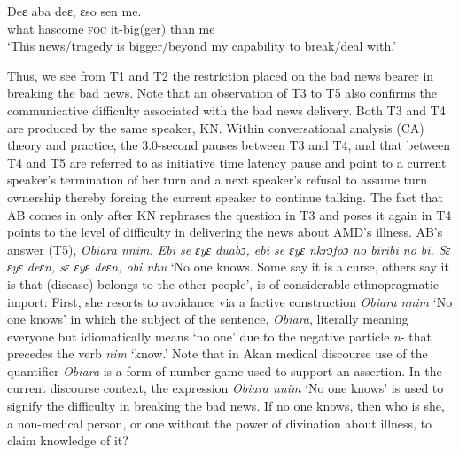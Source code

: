 \documentclass[output=paper,colorlinks,citecolor=brown]{langscibook}
\begin{document}
\ea\label{ex:obeng:29}
    \gll    Deɛ aba deɛ, ɛso sen me.\\
            what hascome \textsc{foc} it-big(ger) than me\\
    \glt    `This news/tragedy is bigger/beyond my capability to break/deal with.'
\z

Thus, we see from T1 and T2 the restriction placed on the bad news bearer in breaking the bad news. Note that an observation of T3 to T5 also confirms the communicative difficulty associated with the bad news delivery. Both T3 and T4 are produced by the same speaker, KN. Within conversational analysis (CA) theory and practice, the 3.0-second pauses between T3 and T4, and that between T4 and T5 are referred to as initiative time latency pause and point to a current speaker’s termination of her turn and a next speaker’s refusal to assume turn ownership thereby forcing the current speaker to continue talking. The fact that AB comes in only after KN rephrases the question in T3 and poses it again in T4 points to the level of difficulty in delivering the news about AMD’s illness. AB’s answer (T5), \textit{Obiara nnim. Ebi se ɛyɛ duabɔ, ebi se ɛyɛ nkrɔfoɔ no biribi no bi. Sɛ ɛyɛ deɛn, sɛ ɛyɛ deɛn, obi nhu} ‘No one knows. Some say it is a curse, others say it is that (disease) belongs to the other people’, is of considerable ethnopragmatic import: First, she resorts to avoidance via a factive construction \textit{Obiara nnim }‘No one knows’ in which the subject of the sentence, \textit{Obiara}, literally meaning everyone but idiomatically means ‘no one’ due to the negative particle \textit{n}- that precedes the verb \textit{nim} ‘know.’ Note that in Akan medical discourse use of the quantifier \textit{Obiara} is a form of number game used to support an assertion. In the current discourse context, the expression \textit{Obiara nnim} ‘No one knows’ is used to signify the difficulty in breaking the bad news. If no one knows, then who is she, a non-medical person, or one without the power of divination about illness, to claim knowledge of it?
\end{document}
